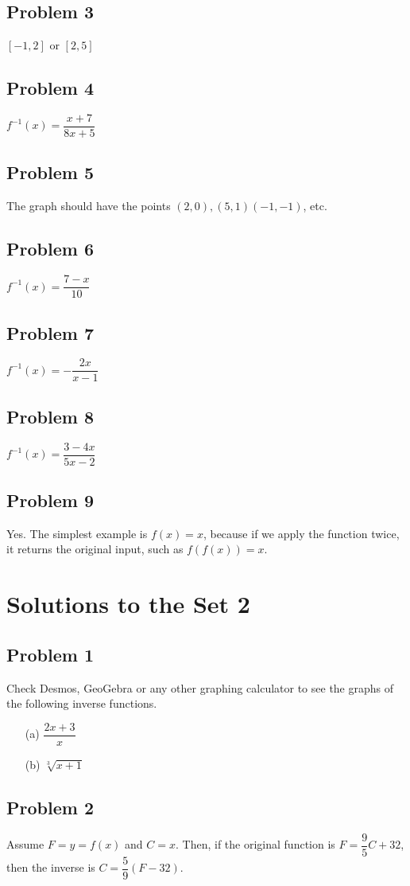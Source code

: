 \documentclass[12pt]{article}
\begin{document}
\subsection*{Problem 3}
\([-1,2]\) or \([2,5]\)
\subsection*{Problem 4}
\(f^{-1}(x)=\dfrac{x+7}{8x+5}\)
\subsection*{Problem 5}
The graph should have the points \((2,0),(5,1)(-1,-1)\), etc.
\subsection*{Problem 6}
\(f^{-1}(x)=\dfrac{7-x}{10}\)
\subsection*{Problem 7}
\(f^{-1}(x)=-\dfrac{2x}{x-1}\)
\subsection*{Problem 8}
\(f^{-1}(x)=\dfrac{3-4x}{5x-2}\)
\subsection*{Problem 9}
Yes. The simplest example is \(f(x)=x\), because if we apply the function twice, it returns the original input, such as \(f(f(x))=x\).

\section*{Solutions to the Set 2}
\subsection*{Problem 1}
Check Desmos, GeoGebra or any other graphing calculator to see the graphs of the following inverse functions.
\begin{enumerate}
    \item[(a)] \(\dfrac{2x+3}{x}\)
    \item[(b)] \(\sqrt[3]{x+1}\)
\end{enumerate}
\subsection*{Problem 2}
Assume \(F=y=f(x)\) and \(C=x\). Then, if the original function is \(F=\dfrac{9}{5}C+32\), then the inverse is \(C=\dfrac{5}{9}(F-32)\).
\end{document}
